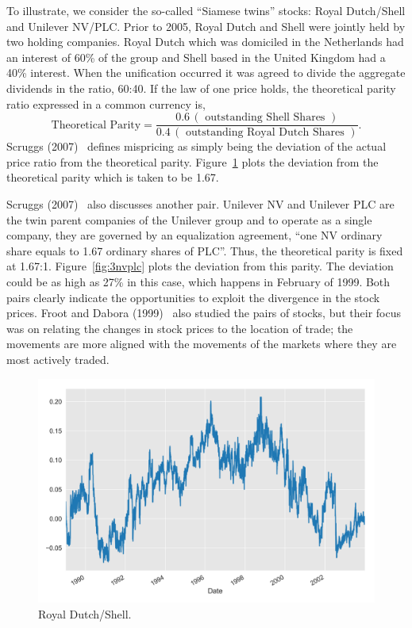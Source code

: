 To illustrate, we consider the so-called ``Siamese twins'' stocks: Royal Dutch/Shell and Unilever NV/PLC. Prior to 2005, Royal Dutch and Shell were jointly held by two holding companies. Royal Dutch which was domiciled in the Netherlands had an interest of 60\% of the group and Shell based in the United Kingdom had a 40\% interest. When the unification occurred it was agreed to divide the aggregate dividends in the ratio, 60:40. If the law of one price holds, the theoretical parity ratio expressed in a common currency is,
	\[
	\text{Theoretical Parity}= \frac{0.6 \,(\text{ outstanding Shell Shares })}{0.4 \,(\text{ outstanding Royal Dutch Shares })}.
	\]
Scruggs (2007)~\cite{scruggs} defines mispricing as simply being the deviation of the actual price ratio from the theoretical parity. Figure~\ref{fig:3royal} plots the deviation from the theoretical parity which is taken to be 1.67. 


Scruggs (2007)~\cite{scruggs} also discusses another pair. Unilever NV and Unilever PLC are the twin parent companies of the Unilever group and to operate as a single company, they are governed by an equalization agreement, ``one NV ordinary share equals to 1.67 ordinary shares of PLC''. Thus, the theoretical parity is fixed at 1.67:1. Figure~\ref{fig:3nvplc} plots the deviation from this parity. The deviation could be as high as 27\% in this case, which happens in February of 1999. Both pairs clearly indicate the opportunities to exploit the divergence in the stock prices. Froot and Dabora (1999)~\cite{froot1999stock} also studied the pairs of stocks, but their focus was on relating the changes in stock prices to the location of trade; the movements are more aligned with the movements of the markets where they are most actively traded.

	\begin{figure}[!ht]
	\centering
	\includegraphics[width=\textwidth]{chapters/chapter_stat_ts/figures/rd_shell.png}
	\caption{Royal Dutch/Shell. \label{fig:3royal}}
	\end{figure}
	
